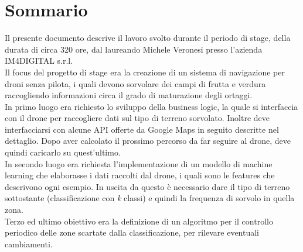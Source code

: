 
\cleardoublepage
{}
{}
\begingroup
\let\clearpage\relax
\let\cleardoublepage\relax
\let\cleardoublepage\relax

\chapter*{Sommario}

Il presente documento descrive il lavoro svolto durante il periodo di stage, della durata di circa 320 ore, dal laureando Michele Veronesi presso l'azienda IM4DIGITAL s.r.l.\\
Il focus del progetto di stage era la creazione di un sistema di navigazione per droni senza pilota, i quali devono sorvolare dei campi di frutta e verdura raccogliendo informazioni
circa il grado di maturazione degli ortaggi.\\
In primo luogo era richiesto lo sviluppo della business logic, la quale si interfaccia con il drone per raccogliere dati sul tipo di terreno sorvolato. Inoltre deve interfacciarsi con
alcune API offerte da Google Maps in seguito descritte nel dettaglio. Dopo aver calcolato il prossimo percorso da far seguire al drone, deve quindi caricarlo su quest'ultimo.\\
In secondo luogo era richiesta l'implementazione di un modello di machine learning che elaborasse i dati raccolti dal drone, i quali sono le features che descrivono ogni esempio. In uscita
da questo è necessario dare il tipo di terreno sottostante (classificazione con \textit{k} classi) e quindi la frequenza di sorvolo in quella zona.\\
Terzo ed ultimo obiettivo era la definizione di un algoritmo per il controllo periodico delle zone scartate dalla classificazione, per rilevare eventuali cambiamenti.

%
%

\endgroup			

\vfill

